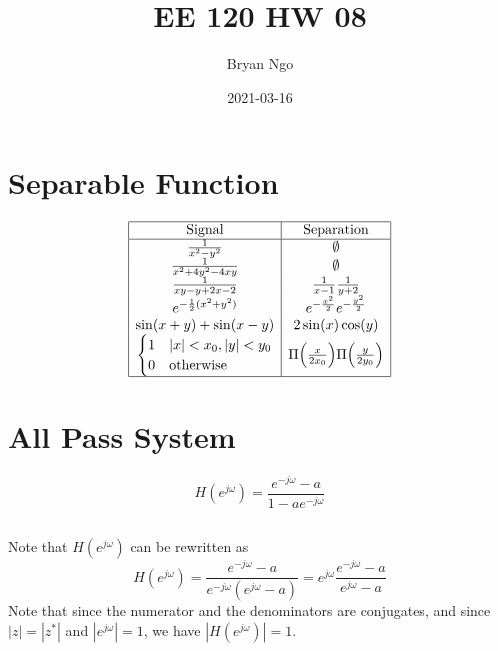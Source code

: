 \documentclass{article}
\title{EE 120 HW 08}
\author{Bryan Ngo}
\date{2021-03-16}
\begin{document}
\maketitle

\section{Separable Function}

\begin{equation}
    \begin{array}{|c|c|}
        \hline
        \text{Signal} & \text{Separation} \\
        \hline
        \frac{1}{x^2 - y^2} & \emptyset \\
        \frac{1}{x^2 + 4y^2 - 4xy} & \emptyset \\
        \frac{1}{xy - y + 2x - 2} & \frac{1}{x - 1} \frac{1}{y + 2} \\
        e^{-\frac{1}{2} (x^2 + y^2)} & e^{-\frac{x^2}{2}} e^{-\frac{y^2}{2}} \\
        \sin(x + y) + \sin(x - y) & 2 \sin(x) \cos(y) \\
        \begin{cases}
            1 & |x| < x_0, |y| < y_0 \\
            0 & \text{otherwise}
        \end{cases} & \Pi\qty(\frac{x}{2x_0}) \Pi\qty(\frac{y}{2y_0}) \\
        \hline
    \end{array}
\end{equation}

\section{All Pass System}

\begin{equation}
    H(e^{j \omega}) = \frac{e^{-j \omega} - a}{1 - ae^{-j \omega}}
\end{equation}

\subsection{}

Note that \(H(e^{j \omega})\) can be rewritten as
\begin{equation}
    H(e^{j \omega}) = \frac{e^{-j \omega} - a}{e^{-j \omega} (e^{j \omega} - a)} = e^{j \omega} \frac{e^{-j \omega} - a}{e^{j \omega} - a}
\end{equation}
Note that since the numerator and the denominators are conjugates, and since \(|z| = |z^\ast|\) and \(|e^{j \omega}| = 1\), we have \(|H(e^{j \omega})| = 1\).
\end{document}
